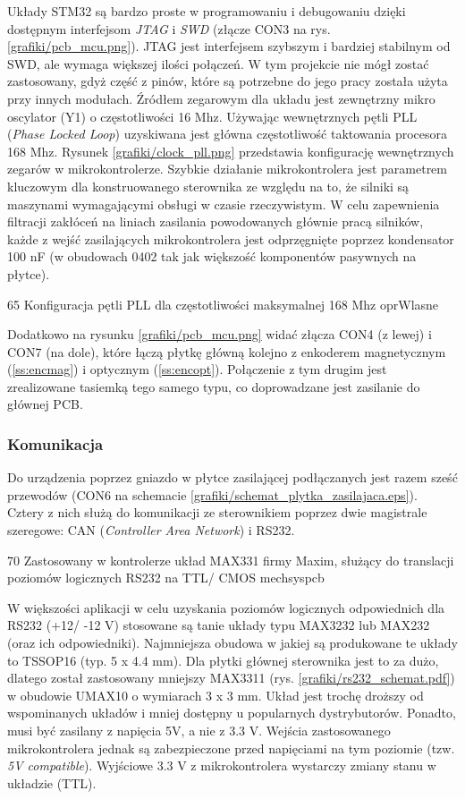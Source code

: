 Układy STM32 są bardzo proste w programowaniu i debugowaniu dzięki dostępnym interfejsom {\it JTAG} i {\it SWD} (złącze CON3 na rys. \ref{grafiki/pcb_mcu.png}). JTAG jest interfejsem szybszym i bardziej stabilnym od SWD, ale wymaga większej ilości połączeń. W tym projekcie nie mógł zostać zastosowany, gdyż część z pinów, które są potrzebne do jego pracy została użyta przy innych modułach. Źródłem zegarowym dla układu jest zewnętrzny mikro oscylator (Y1) o częstotliwości 16 Mhz. Używając wewnętrznych pętli PLL ({\it Phase Locked Loop}) uzyskiwana jest główna częstotliwość taktowania procesora 168 Mhz. Rysunek \ref{grafiki/clock_pll.png} przedstawia konfigurację wewnętrznych zegarów w mikrokontrolerze. Szybkie działanie mikrokontrolera jest parametrem kluczowym dla konstruowanego sterownika ze względu na to, że silniki są maszynami wymagającymi obsługi w czasie rzeczywistym. W celu zapewnienia filtracji zakłóceń na liniach zasilania powodowanych głównie pracą silników, każde z wejść zasilających mikrokontrolera jest odprzęgnięte poprzez kondensator 100 nF (w obudowach 0402 tak jak większość komponentów pasywnych na płytce). 

	{65}
	{Konfiguracja pętli PLL dla częstotliwości maksymalnej 168 Mhz}
	{oprWlasne}

Dodatkowo na rysunku \ref{grafiki/pcb_mcu.png} widać złącza CON4 (z lewej) i CON7 (na dole), które łączą płytkę główną kolejno z enkoderem magnetycznym (\ref{ss:encmag}) i optycznym (\ref{ss:encopt}). Połączenie z tym drugim jest zrealizowane tasiemką tego samego typu, co doprowadzane jest zasilanie do głównej PCB.

\subsubsection{Komunikacja}
\label{sss:hardware_komunikacja}

Do urządzenia poprzez gniazdo w płytce zasilającej podłączanych jest razem sześć przewodów (CON6 na schemacie \ref{grafiki/schemat_plytka_zasilajaca.eps}). Cztery z nich służą do komunikacji ze sterownikiem poprzez dwie magistrale szeregowe: CAN ({\it Controller Area Network}) i RS232.

	{70}
	{Zastosowany w kontrolerze układ MAX331 firmy Maxim, służący do translacji poziomów logicznych RS232 na TTL/ CMOS}
	{mechsyspcb}

W większości aplikacji w celu uzyskania poziomów logicznych odpowiednich dla RS232 (+12/ -12 V) stosowane są tanie układy typu MAX3232 lub MAX232 (oraz ich odpowiedniki). Najmniejsza obudowa w jakiej są produkowane te układy to TSSOP16 (typ. 5 x 4.4 mm). Dla płytki głównej sterownika jest to za dużo, dlatego został zastosowany mniejszy   MAX3311 (rys. \ref{grafiki/rs232_schemat.pdf}) w obudowie UMAX10 o wymiarach 3 x 3 mm. Układ jest trochę droższy od wspominanych układów i mniej dostępny u popularnych dystrybutorów. Ponadto, musi być zasilany z napięcia 5V, a nie z 3.3 V. Wejścia zastosowanego mikrokontrolera jednak są zabezpieczone przed napięciami na tym poziomie (tzw. {\it 5V compatible}). Wyjściowe 3.3 V z mikrokontrolera wystarczy zmiany stanu w układzie (TTL).

